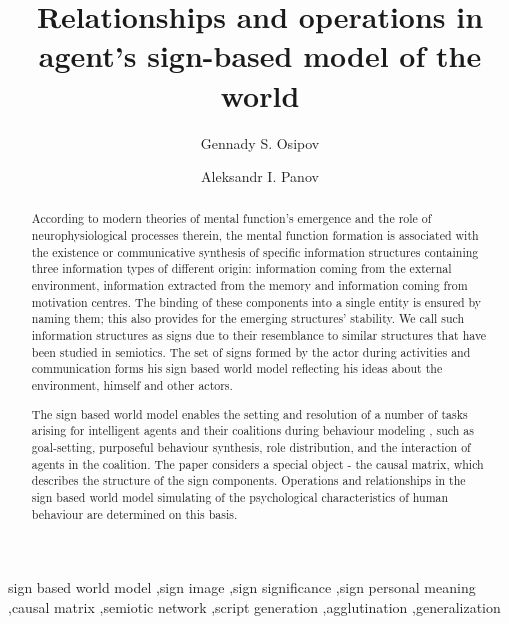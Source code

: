 \documentclass[review]{elsarticle}
\begin{document}
\begin{frontmatter}

\title{Relationships and operations in agent's sign-based model of the world}

\author{Gennady S. Osipov}

\author{Aleksandr I. Panov}


\address{Federal Research Center ``Computer Science and Control'' Russian Academy of Sciences, Moscow, Russia}

\begin{abstract}
According to modern theories of mental function's emergence and the role of neurophysiological processes therein, the mental function formation is associated with the existence or communicative synthesis of specific information structures containing three information types of different origin: information coming from the external environment, information extracted from the memory and information coming from motivation centres. The binding of these components into a single entity is ensured by naming them; this also provides for the emerging structures’ stability. We call such information structures as signs due to their resemblance to similar structures that have been studied in semiotics. The set of signs formed by the actor during activities and communication forms his sign based world model reflecting his ideas about the environment, himself and other actors.

The sign based world model enables the setting and resolution of a number of tasks arising for intelligent agents and their coalitions during behaviour modeling , such as goal-setting, purposeful behaviour synthesis, role distribution, and the interaction of agents in the coalition. The paper considers a special object - the causal matrix, which describes the structure of the sign components. Operations and relationships in the sign based world model simulating of the psychological characteristics of human behaviour are determined on this basis.
\end{abstract}

\begin{keyword}
sign based world model \sep sign image \sep sign significance \sep sign personal meaning \sep causal matrix \sep semiotic network \sep script generation \sep agglutination \sep generalization
\end{keyword}

\end{frontmatter}
\end{document}
